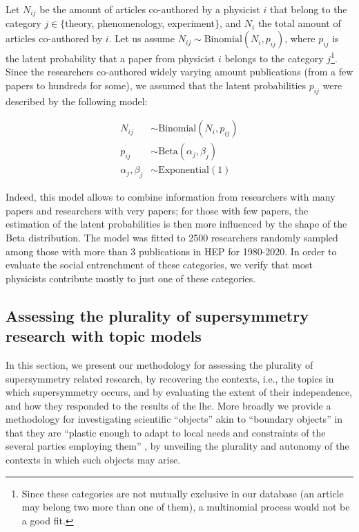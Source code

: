 \documentclass[smallextended]{svjour3}
\begin{document}
Let $N_{ij}$ be the amount of articles co-authored by a physicist $i$ that belong to the category $j \in \{$theory, phenomenology, experiment$\}$, and $N_i$ the total amount of articles co-authored by $i$. Let us assume $N_{ij} \sim \mathrm{Binomial}(N_i, p_{ij})$, where $p_{ij}$ is the latent probability that a paper from physicist $i$ belongs to the category $j$\footnote{Since these categories are not mutually exclusive in our database (an article may belong two more than one of them), a multinomial process would not be a good fit.}. Since the researchers co-authored widely varying amount publications (from a few papers to hundreds for some), we assumed that the latent probabilities $p_{ij}$ were described by the following model:

\begin{align*}
    N_{ij} &\sim \mathrm{Binomial}(N_i, p_{ij})\\
    p_{ij} &\sim \mathrm{Beta}(\alpha_j, \beta_j) \\
    \alpha_j,\beta_j &\sim \mathrm{Exponential}(1)
\end{align*}

Indeed, this model allows to combine information from researchers with many papers and researchers with very papers; for those with few papers, the estimation of the latent probabilities is then more influenced by the shape of the Beta distribution. The model was fitted to 2500 researchers randomly sampled among those with more than 3 publications in HEP for 1980-2020. In order to evaluate the social entrenchment of these categories, we verify that most physicists contribute mostly to just one of these categories.

\subsection{Assessing the plurality of supersymmetry research with topic models}\label{section:method_plurality}

In this section, we present our methodology for assessing the plurality of supersymmetry related research, by recovering the contexts, i.e., the topics in which supersymmetry occurs, and by evaluating the extent of their independence, and how they responded to the results of the \gls{lhc}. More broadly we provide a methodology for investigating scientific ``objects'' akin to ``boundary objects'' in that they are ``plastic enough to adapt to local needs and constraints of the several parties employing them'' \citep[p.~393]{Star1989}, by unveiling the plurality and autonomy of the contexts in which such objects may arise.
\end{document}
